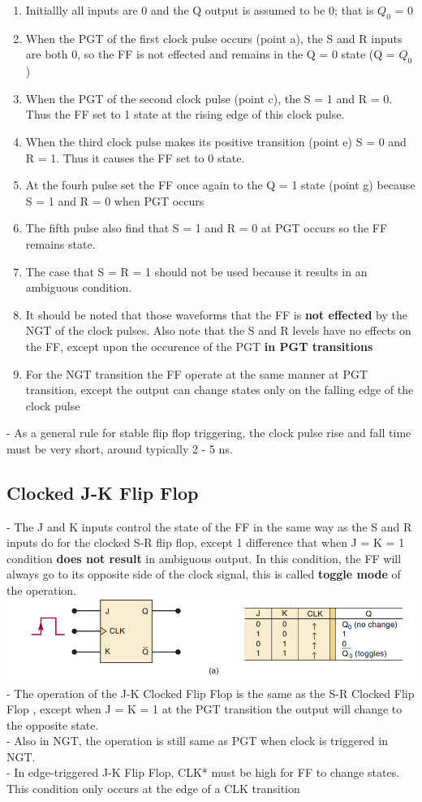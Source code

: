 \documentclass[12pt]{article}
\begin{document}
\begin{enumerate}
	\item Initiallly all inputs are 0 and the Q output is assumed to be 0; that is $Q_0$ = 0
	\item When the PGT of the first clock pulse occurs (point a), the S and R inputs are both 0, so the FF is not effected and remains in the Q = 0 state (Q = $Q_0$)
	\item When the PGT of the second clock pulse (point c), the S = 1 and R = 0. Thus the FF set to 1 state at the rising edge of this clock pulse.
	\item When the third clock pulse makes its positive transition (point e) S = 0 and R = 1. Thus it causes the FF set to 0 state.
	\item At the fourh pulse set the FF once again to the Q = 1 state (point g) because S = 1 and R = 0 when PGT occurs
	\item The fifth pulse also find that S = 1 and R = 0 at PGT occurs so the FF remains state.
	\item The case that S = R = 1 should not be used because it results in an ambiguous condition.
	\item It should be noted that those waveforms that the FF is \textbf{not effected} by the NGT of the clock pulses. Also note that the S and R levels have no effects on the FF, except upon the occurence of the PGT \textbf{in PGT transitions}
	\item For the NGT transition the FF operate at the same manner at PGT transition, except the output can change states only on the falling edge of the clock pulse 
\end{enumerate}
- As a general rule for stable flip flop triggering, the clock pulse rise and fall time must be very short, around typically 2 - 5 ns. \\
\subsection{Clocked J-K Flip Flop}
- The J and K inputs control the state of the FF in the same way as the S and R inputs do for the clocked S-R flip flop, except 1 difference that when J = K = 1 condition \textbf{does not result} in ambiguous output. In this condition, the FF will always go to its opposite side of the clock signal, this is called \textbf{toggle mode} of the operation.\\
\includegraphics[scale = 0.8]{hinh11}
\bigbreak
- The operation of the J-K Clocked Flip Flop is the same as the S-R Clocked Flip Flop , except when J = K = 1 at the PGT transition the output will change to the opposite state. \\
- Also in NGT, the operation is still same as PGT when clock is triggered in NGT.\\
- In edge-triggered J-K Flip Flop, CLK* must be high for FF to change states. This condition only occurs at the edge of a CLK transition
\end{document}
